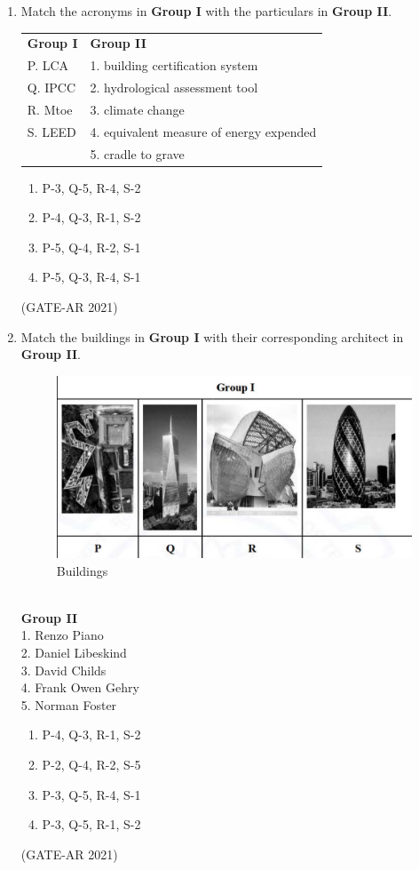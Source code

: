 \documentclass[a4paper,10pt]{article}
\begin{document}
\begin{enumerate}
    \item Match the acronyms in \textbf{Group I} with the particulars in \textbf{Group II}. \\
    \begin{tabular}{ l l }
    \textbf{Group I} & \textbf{Group II} \\
    P. LCA & 1. building certification system \\
    Q. IPCC & 2. hydrological assessment tool \\
    R. Mtoe & 3. climate change \\
    S. LEED & 4. equivalent measure of energy expended \\
    & 5. cradle to grave \\
    \end{tabular}
    \begin{multicols}{2}
    \begin{enumerate}
        \item P-3, Q-5, R-4, S-2
        \item P-4, Q-3, R-1, S-2
        \item P-5, Q-4, R-2, S-1
        \item P-5, Q-3, R-4, S-1
    \end{enumerate}
    \end{multicols}
    \hfill (GATE-AR 2021)

    \item Match the buildings in \textbf{Group I} with their corresponding architect in \textbf{Group II}. \\
    \begin{figure}[h!]
    \centering
    \includegraphics[width=0.5\columnwidth]{figs/08.jpg}
    \caption{Buildings}
    \label{fig:Img08}
    \end{figure} \\
    \textbf{Group II} \\
    1. Renzo Piano \\ 
    2. Daniel Libeskind \\
    3. David Childs \\
    4. Frank Owen Gehry \\
    5. Norman Foster \\
    \begin{multicols}{2}
    \begin{enumerate}
        \item P-4, Q-3, R-1, S-2
        \item P-2, Q-4, R-2, S-5
        \item P-3, Q-5, R-4, S-1
        \item P-3, Q-5, R-1, S-2
    \end{enumerate}
    \end{multicols}
    \hfill (GATE-AR 2021)


\end{enumerate}
\end{document}
